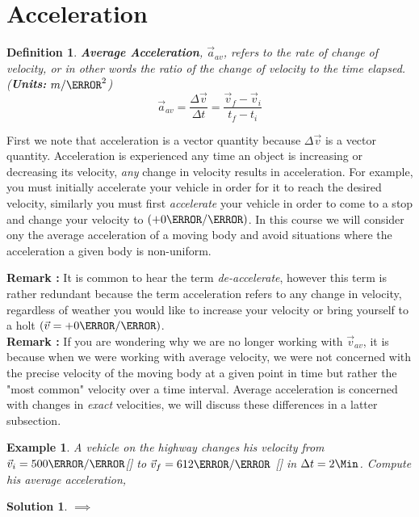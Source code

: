 \documentclass[12pt]{article}
\newcommand{\tx}[1]{\text{#1}}
\theoremstyle{break}
\newtheorem{ex}[thm]{Example}
\newtheorem*{soln}{Solution}
\newtheorem{defn}{Definition}[subsection]
\begin{document}
\let\ref\Cref
\section{Acceleration}
\begin{defn}
\textbf{Average Acceleration}, $\vec a_{av}$, refers to the rate of change of velocity, or in other words the ratio of the change of velocity to the time elapsed. (\textbf{Units:} $m / \s^2$)
$$\vec a_{av} = \frac{\Delta \vec v}{\Delta t} = \frac{\vec v_f - \vec v_i}{t_f - t_i}$$
\end{defn}
First we note that acceleration is a vector quantity because $\Delta \vec v$ is a vector quantity. Acceleration is experienced any time an object is increasing or decreasing its velocity, \emph{any} change in velocity results in acceleration. For example, you must initially accelerate your vehicle in order for it to reach the desired velocity, similarly you must first \emph{accelerate} your vehicle in order to come to a stop and change your velocity to $(+0\m / \s)$. In this course we will consider ony the average acceleration of a moving body and avoid situations where the acceleration a given body is non-uniform.

\textbf{Remark :} It is common to hear the term \emph{de-accelerate}, however this term is rather redundant because the term acceleration refers to any change in velocity, regardless of weather you would like to increase your velocity or bring yourself to a holt $(\vec v = +0\m / \s)$. \\

\textbf{Remark :} If you are wondering why we are no longer working with $\vec v_{av}$, it is because when we were working with average velocity, we were not concerned with the precise velocity of the moving body at a given point in time but rather the "most common" velocity over a time interval. Average acceleration is concerned with changes in \emph{exact} velocities, we will discuss these differences in a latter subsection.

\begin{ex}
A vehicle on the highway changes his velocity from $\vec v_i = 500 \m / \s $[\tx{East}] to $\vec v_f = 612 \m / \s$ [\tx{West}] in $\Delta t = 2\Min$. Compute his average acceleration,
\end{ex}
\begin{soln}
	$\implies$
\vspace*{4cm}
\end{soln}
\end{document}
